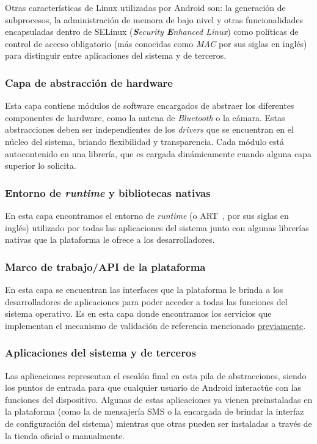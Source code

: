 Otras características de Linux utilizadas por Android son: la generación de subprocesos, la
administración de memora de bajo nivel y otras funcionalidades encapsuladas dentro de SELinux
(\textit{\textbf{S}ecurity \textbf{E}nhanced Linux}) como políticas de control de acceso obligatorio
(más conocidas como \textit{MAC} por sus siglas en inglés) para distinguir entre aplicaciones del
sistema y de terceros.

\subsubsection*{Capa de abstracción de hardware}
Esta capa contiene módulos de software encargados de abstraer los diferentes componentes de hardware,
como la antena de \textit{Bluetooth} o la cámara. Estas abstracciones deben ser independientes de los
\textit{drivers} que se encuentran en el núcleo del sistema, briando flexibilidad y transparencia.
Cada módulo está autocontenido en una librería, que es cargada dinámicamente cuando alguna capa
superior lo solicita.

\subsubsection*{Entorno de \textit{runtime} y bibliotecas nativas}
En esta capa encontramos el entorno de \textit{runtime} (o ART~\cite{art}, por sus siglas en inglés)
utilizado por todas las aplicaciones del sistema junto con algunas librerías nativas que la plataforma
le ofrece a los desarrolladores.

\subsubsection*{Marco de trabajo/API de la plataforma}
En esta capa se encuentran las interfaces que la plataforma le brinda a los desarrolladores de
aplicaciones para poder acceder a todas las funciones del sistema operativo. Es en esta capa donde
encontramos los servicios que implementan el mecanismo de validación de referencia mencionado
\hyperref[section:architecture:kernel]{previamente}.

\subsubsection*{Aplicaciones del sistema y de terceros}
Las aplicaciones representan el escalón final en esta pila de abstracciones, siendo los puntos de
entrada para que cualquier usuario de Android interactúe con las funciones del dispositivo. Algunas de
estas aplicaciones ya vienen preinstaladas en la plataforma (como la de mensajería SMS o la encargada
de brindar la interfaz de configuración del sistema) mientras que otras pueden ser instaladas a través
de la tienda oficial o manualmente.


